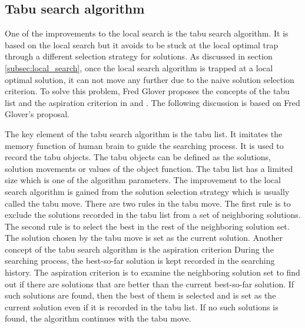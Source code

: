 		\subsection{Tabu search algorithm}
		\label{subsec:tabu_search}
		One of the improvements to the local search is the tabu search algorithm.
		It is based on the local search but it avoids to be stuck at the
		local optimal trap through a different selection strategy for solutions.
		As discussed in section \ref{subsec:local_search}, once the local search
		algorithm is trapped at a local optimal solution, it can not move any
		further due to the naive solution selection criterion.
		To solve this problem, Fred Glover proposes the concepts of the tabu list
		and the aspiration criterion in
		\cite{doi:10.1287/ijoc.1.3.190} and \cite{doi:10.1287/ijoc.2.1.4}.
		The following discussion is based on Fred Glover's proposal.
		
		The key element of the tabu search algorithm is the tabu list.
		It imitates the memory function of human brain to guide the searching process.
		It is used to record the tabu objects. The tabu objects can be defined
		as the solutions, solution movements or values of the  object function.
		The tabu list has a limited size which is one of the algorithm parameters.
		The improvement to the local search algorithm is gained from the solution
		selection strategy which is usually called the tabu move.
		There are two rules in the tabu move. The first rule is to exclude the
		solutions recorded in the tabu list from a set of neighboring solutions.
		The second rule is to select the best in the rest of the neighboring
		solution set. The solution chosen by the tabu move is set as the current solution.
		Another concept of the tabu search algorithm is the aspiration criterion
		During the searching process, the best-so-far solution is kept recorded in
		the searching history. The aspiration criterion is to examine the neighboring
		solution set to find out if there are solutions that are better than the
		current best-so-far solution. If such solutions are found, then the best
		of them is selected and is set as the current solution even if it is recorded
		in the tabu list. If no such solutions is found, the algorithm continues with
		the tabu move.
		
		
		
